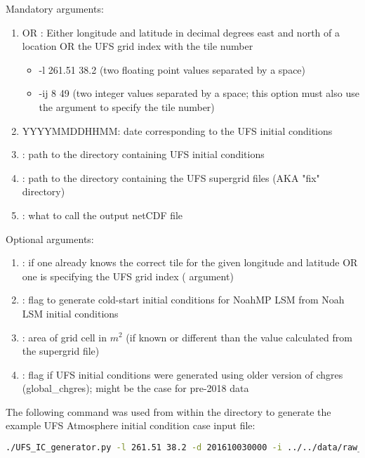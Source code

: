 Mandatory arguments:
\begin{enumerate}
\item {} OR :  Either longitude and latitude in decimal degrees east and north of a location OR the UFS grid index with the tile number
	\begin{itemize}
		\item -l 261.51 38.2 (two floating point values separated by a space)
		\item -ij 8 49 (two integer values separated by a space; this option must also use the  argument to specify the tile number)
	\end{itemize}
\item {} YYYYMMDDHHMM: date corresponding to the UFS initial conditions
\item {}: path to the directory containing UFS initial conditions
\item {}: path to the directory containing the UFS supergrid files (AKA "fix" directory)
\item {}: what to call the output netCDF file
\end{enumerate}

Optional arguments:
\begin{enumerate}
\item {}: if one already knows the correct tile for the given longitude and latitude OR one is specifying the UFS grid index ( argument)
\item {}: flag to generate cold-start initial conditions for NoahMP LSM from Noah LSM initial conditions
\item {}: area of grid cell in $m^2$ (if known or different than the value calculated from the supergrid file)
\item {}: flag if UFS initial conditions were generated using older version of chgres (global\_chgres); might be the case for pre-2018 data
\end{enumerate}

The following command was used from within the  directory to generate the example UFS Atmosphere initial condition case input file:
\begin{lstlisting}[language=bash]
./UFS_IC_generator.py -l 261.51 38.2 -d 201610030000 -i ../../data/raw_case_input/FV3_C96_example_ICs -g ../../data/raw_case_input/FV3_C96_example_ICs -n fv3_model_point_noah -oc
\end{lstlisting}

